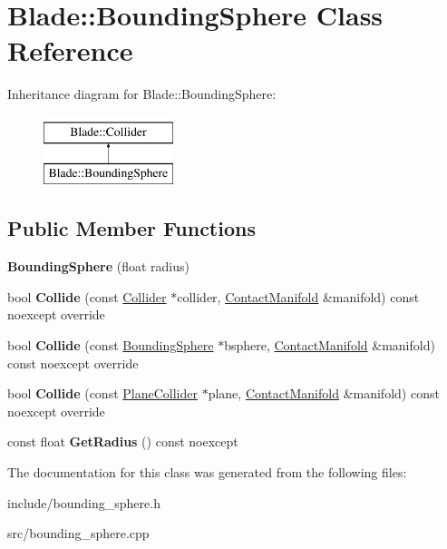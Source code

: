 \hypertarget{class_blade_1_1_bounding_sphere}{}\section{Blade\+:\+:Bounding\+Sphere Class Reference}
\label{class_blade_1_1_bounding_sphere}
Inheritance diagram for Blade\+:\+:Bounding\+Sphere\+:\begin{figure}[H]
\begin{center}
\leavevmode
\includegraphics[height=2.000000cm]{class_blade_1_1_bounding_sphere}
\end{center}
\end{figure}
\subsection*{Public Member Functions}
\begin{DoxyCompactItemize}
\item 
\mbox{\label{class_blade_1_1_bounding_sphere_aec916c2cd1d3b23b952df9136587bca4}} 
{\bfseries Bounding\+Sphere} (float radius)
\item 
\mbox{\label{class_blade_1_1_bounding_sphere_a8d0a579f9489d9e2cc4911b55722df2d}} 
bool {\bfseries Collide} (const \hyperlink{class_blade_1_1_collider}{Collider} $\ast$collider, \hyperlink{class_blade_1_1_contact_manifold}{Contact\+Manifold} \&manifold) const noexcept override
\item 
\mbox{\label{class_blade_1_1_bounding_sphere_aab2fbff2d3b536952ecb52f2b5f099d1}} 
bool {\bfseries Collide} (const \hyperlink{class_blade_1_1_bounding_sphere}{Bounding\+Sphere} $\ast$bsphere, \hyperlink{class_blade_1_1_contact_manifold}{Contact\+Manifold} \&manifold) const noexcept override
\item 
\mbox{\label{class_blade_1_1_bounding_sphere_ab9af5d52b02398b5042daec7af779f33}} 
bool {\bfseries Collide} (const \hyperlink{class_blade_1_1_plane_collider}{Plane\+Collider} $\ast$plane, \hyperlink{class_blade_1_1_contact_manifold}{Contact\+Manifold} \&manifold) const noexcept override
\item 
\mbox{\label{class_blade_1_1_bounding_sphere_a3c3cf74247377f10b324d36ebd1ca4bd}} 
const float {\bfseries Get\+Radius} () const noexcept
\end{DoxyCompactItemize}


The documentation for this class was generated from the following files\+:\begin{DoxyCompactItemize}
\item 
include/bounding\+\_\+sphere.\+h\item 
src/bounding\+\_\+sphere.\+cpp\end{DoxyCompactItemize}
